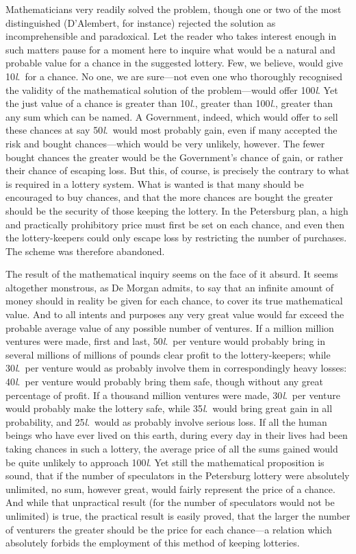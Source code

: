 \documentclass[letterpaper,12pt,oneside,openany]{memoir}
\begin{document}
Mathematicians very readily solved the problem,
though one or two of the most distinguished (D'Alembert,
for instance) rejected the solution as incomprehensible
and paradoxical. Let the reader who takes
interest enough in such matters pause for a moment
here to inquire what would be a natural and probable
value for a chance in the suggested lottery. Few, we
believe, would give 10\textit{l}.\ for a chance. No one, we are
sure---not even one who thoroughly recognised the
validity of the mathematical solution of the problem---would
offer 100\textit{l}. Yet the just value of a chance is
greater than 10\textit{l}., greater than 100\textit{l}., greater than any
sum which can be named. A Government, indeed,
which would offer to sell these chances at say 50\textit{l}.\ would
most probably gain, even if many accepted the
risk and bought chances---which would be very unlikely,
however. The fewer bought chances the greater would
be the Government's chance of gain, or rather their
chance of escaping loss. But this, of course, is precisely
the contrary to what is required in a lottery system.
What is wanted is that many should be encouraged to
buy chances, and that the more chances are bought the
greater should be the security of those keeping the
lottery. In the Petersburg plan, a high and practically
prohibitory price must first be set on each chance, and
even then the lottery-keepers could only escape loss by
restricting the number of purchases. The scheme was
therefore abandoned.

The result of the mathematical inquiry seems on
the face of it absurd. It seems altogether monstrous,
as De Morgan admits, to say that an infinite amount
of money should in reality be given for each chance, to
cover its true mathematical value. And to all intents
and purposes any very great value would far exceed
the probable average value of any possible number of
ventures. If a million million ventures were made,
first and last, 50\textit{l}.\ per venture would probably bring in
several millions of millions of pounds clear profit to the
lottery-keepers; while 30\textit{l}.\ per venture would as probably
involve them in correspondingly heavy losses: 40\textit{l}.\ per
venture would probably bring them safe, though without
any great percentage of profit. If a thousand
million ventures were made, 30\textit{l}.\ per venture would
probably make the lottery safe, while 35\textit{l}.\ would bring
great gain in all probability, and 25\textit{l}.\ would as probably
involve serious loss. If all the human beings who have
ever lived on this earth, during every day in their lives
had been taking chances in such a lottery, the average
price of all the sums gained would be quite unlikely to
approach 100\textit{l}. Yet still the mathematical proposition
is sound, that if the number of speculators in the
Petersburg lottery were absolutely unlimited, no sum,
however great, would fairly represent the price of a
chance. And while that unpractical result (for the
number of speculators would not be unlimited) is true,
the practical result is easily proved, that the larger the
number of venturers the greater should be the price for
each chance---a relation which absolutely forbids the
employment of this method of keeping lotteries.
\end{document}
